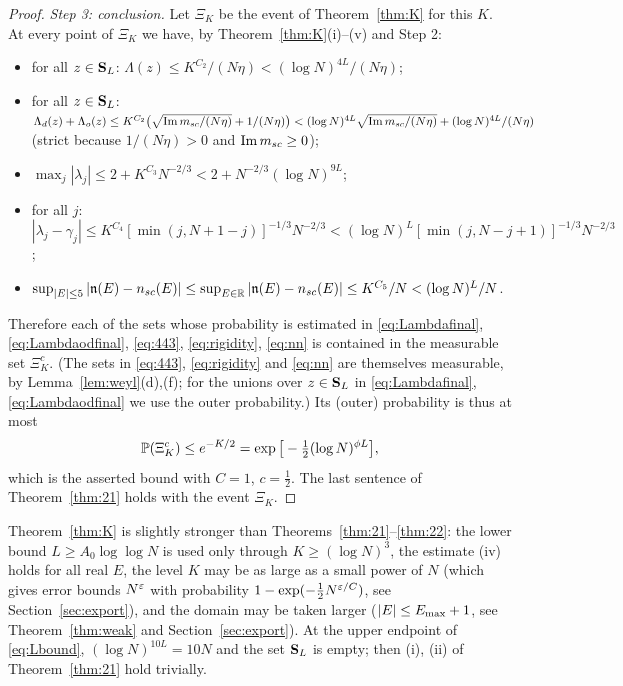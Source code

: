 \begin{proof}
\emph{Step 3: conclusion.} Let $\Xi_K$ be the event of Theorem~\ref{thm:K} for this $K$. At every point of $\Xi_K$ we have, by Theorem~\ref{thm:K}(i)--(v) and Step 2:
\begin{itemize}[leftmargin=2em,itemsep=1pt]
\item for all $z\in\mathbf{S}_L$: $\Lambda(z)\le K^{C_2}/(N\eta)<(\log N)^{4L}/(N\eta)$;
\item for all $z\in\mathbf{S}_L$: $\Lambda_d(z)+\Lambda_o(z)\le K^{C_2}\big(\sqrt{\operatorname{Im}m_{sc}/(N\eta)}+1/(N\eta)\big)<(\log N)^{4L}\sqrt{\operatorname{Im}m_{sc}/(N\eta)}+(\log N)^{4L}/(N\eta)$ (strict because $1/(N\eta)>0$ and $\operatorname{Im}m_{sc}\ge0$);
\item $\max_j|\lambda_j|\le2+K^{C_3}N^{-2/3}<2+N^{-2/3}(\log N)^{9L}$;
\item for all $j$: $|\lambda_j-\gamma_j|\le K^{C_4}[\min(j,N+1-j)]^{-1/3}N^{-2/3}<(\log N)^{L}[\min(j,N-j+1)]^{-1/3}N^{-2/3}$;
\item $\sup_{|E|\le5}|\mathfrak{n}(E)-n_{sc}(E)|\le\sup_{E\in\mathbb{R}}|\mathfrak{n}(E)-n_{sc}(E)|\le K^{C_5}/N<(\log N)^L/N$.
\end{itemize}
Therefore each of the sets whose probability is estimated in \eqref{eq:Lambdafinal}, \eqref{eq:Lambdaodfinal}, \eqref{eq:443}, \eqref{eq:rigidity}, \eqref{eq:nn} is contained in the measurable set $\Xi_K^c$.
(The sets in \eqref{eq:443}, \eqref{eq:rigidity} and \eqref{eq:nn} are themselves measurable, by Lemma~\ref{lem:weyl}(d),(f); for the unions over $z\in\mathbf{S}_L$ in \eqref{eq:Lambdafinal}, \eqref{eq:Lambdaodfinal} we use the outer probability.)
Its (outer) probability is thus at most
\[
 \mathbb{P}(\Xi_K^c)\le e^{-K/2}=\exp\big[-\tfrac12(\log N)^{\phi L}\big],
\]
which is the asserted bound with $C=1$, $c=\frac12$. The last sentence of Theorem~\ref{thm:21} holds with the event $\Xi_K$.
\end{proof}

\begin{remark}\label{rem:Kstronger}
Theorem~\ref{thm:K} is slightly stronger than Theorems~\ref{thm:21}--\ref{thm:22}: the lower bound $L\ge A_0\log\log N$ is used only through $K\ge(\log N)^3$,
the estimate \textup{(iv)} holds for all real $E$, the level $K$ may be as large as a small power of $N$ (which gives error bounds $N^{\varepsilon}$ with probability $1-\exp(-\frac12N^{\varepsilon/C})$, see Section~\ref{sec:export}),
and the domain may be taken larger ($|E|\le E_{\max}+1$, see Theorem~\ref{thm:weak} and Section~\ref{sec:export}).
At the upper endpoint of \eqref{eq:Lbound}, $(\log N)^{10L}=10N$ and the set $\mathbf{S}_L$ is empty; then \textup{(i)}, \textup{(ii)} of Theorem~\ref{thm:21} hold trivially.
\end{remark}
